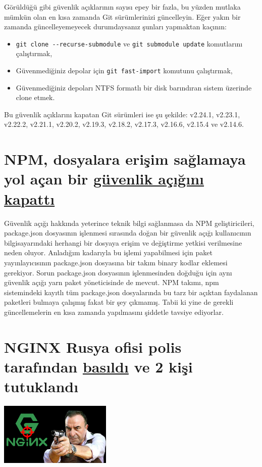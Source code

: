 \documentclass[11pt]{article}
\begin{document}
Görüldüğü gibi güvenlik açıklarının sayısı epey bir fazla, bu yüzden mutlaka
mümkün olan en kısa zamanda Git sürümlerinizi güncelleyin. Eğer yakın bir
zamanda güncelleyemeyecek durumdaysanız şunları yapmaktan kaçının:
\begin{itemize}
\item \texttt{git clone -{}-recurse-submodule} ve \texttt{git submodule update} komutlarını çalıştırmak,
\item Güvenmediğiniz depolar için \texttt{git fast-import} komutunu çalıştırmak,
\item Güvenmediğiniz depoları NTFS formatlı bir disk barındıran sistem üzerinde
clone etmek.
\end{itemize}

Bu güvenlik açıklarını kapatan Git sürümleri ise şu şekilde: v2.24.1, v2.23.1,
v2.22.2, v2.21.1, v2.20.2, v2.19.3, v2.18.2, v2.17.3, v2.16.6, v2.15.4 ve
v2.14.6.
\section{NPM, dosyalara erişim sağlamaya yol açan bir \href{https://blog.npmjs.org/post/189618601100/binary-planting-with-the-npm-cli}{güvenlik açığını kapattı}}
\label{sec:org769f5c3}
Güvenlik açığı hakkında yeterince teknik bilgi sağlanmasa da NPM
geliştiricileri, package.json dosyasının işlenmesi sırasında doğan bir güvenlik
açığı kullanıcının bilgisayarındaki herhangi bir dosyaya erişim ve değiştirme
yetkisi verilmesine neden oluyor. Anladığım kadarıyla bu işlemi yapabilmesi
için paket yayınlayıcısının package.json dosyasına bir takım binary kodlar
eklemesi gerekiyor. Sorun package.json dosyasının işlenmesinden doğduğu için
aynı güvenlik açığı yarn paket yöneticisinde de mevcut. NPM takımı, npm
sistemindeki kayıtlı tüm package.json dosyalarında bu tarz bir açıktan
faydalanan paketleri bulmaya çalışmış fakat bir şey çıkmamış. Tabii ki yine de
gerekli güncellemelerin en kısa zamanda yapılmasını şiddetle tavsiye ediyorlar.
\section{NGINX Rusya ofisi polis tarafından \href{https://www.zdnet.com/google-amp/article/russian-police-raid-nginx-moscow-office/}{basıldı} ve 2 kişi tutuklandı}
\label{sec:org9f95da0}
\begin{center}
\includegraphics[height=3cm]{gorseller/nginx-polis-baskını.png}
\end{center}
\end{document}
